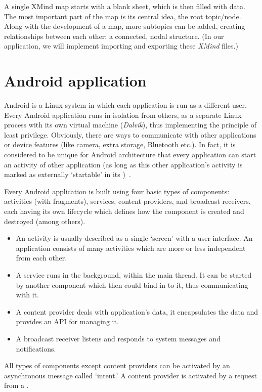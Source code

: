 A single XMind map starts with a blank sheet, which is then filled with data. The most important part of the map is its central idea, the root topic/node. Along with the development of a map, more subtopics can be added, creating relationships between each other: a connected, nodal structure. (In our application, we will implement importing and exporting these {\em XMind} files.)

\section{Android application}
\label{sec:android-theory}

Android is a Linux system in which each application is run as a different user. Every Android application runs in isolation from others, as a separate Linux process with its own virtual machine ({\em Dalvik}), thus implementing the principle of least privilege. Obviously, there are ways to communicate with other applications or device features (like camera, extra storage, Bluetooth etc.). In fact, it is considered to be unique for Android architecture that every application can start an activity of other application (as long as this other application's activity is marked as externally `startable' in its )~\cite{Collins:Android}.

Every Android application is built using four basic types of components: activities (with fragments), services, content providers, and broadcast receivers, each having its own lifecycle which defines how the component is created and destroyed (among others).

\begin{itemize}
	\item An activity is usually described as a single `screen' with a user interface. An application consists of many activities which are more or less independent from each other.
	\item A service runs in the background, within the main thread. It can be started by another component which then could bind-in to it, thus communicating with it.
	\item A content provider deals with application's data, it encapsulates the data and provides an API for managing it.
	\item A broadcast receiver listens and responds to system messages and notifications.
\end{itemize}

All types of components except content providers can be activated by an asynchronous message called `intent.' A content provider is activated by a request from a .

